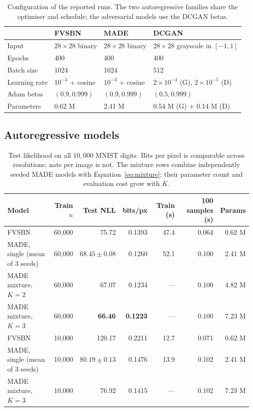 \documentclass[11pt,a4paper]{article}
\begin{document}
\begin{table}[H]
\centering
\caption{Configuration of the reported runs. The two autoregressive families share the
optimiser and schedule; the adversarial models use the DCGAN betas.}
\label{tab:setup}
\small
\begin{tabular}{llll}
\toprule
 & FVSBN & MADE & DCGAN \\
\midrule
Input & $28\times28$ binary & $28\times28$ binary & $28\times28$ grayscale in $[-1,1]$ \\
Epochs & 400 & 400 & 400 \\
Batch size & 1024 & 1024 & 512 \\
Learning rate & $10^{-3}$ + cosine & $10^{-3}$ + cosine & $2\times10^{-4}$ (G), $2\times10^{-5}$ (D) \\
Adam betas & $(0.9,0.999)$ & $(0.9,0.999)$ & $(0.5,0.999)$ \\
Parameters & 0.62 M & 2.41 M & 0.54 M (G) + 0.14 M (D) \\
\bottomrule
\end{tabular}
\end{table}

\subsection{Autoregressive models}
\label{sec:ar-results}

\begin{table}[H]
\centering
\caption{Test likelihood on all $10{,}000$ MNIST digits. Bits per pixel is comparable across
resolutions; nats per image is not. The mixture rows combine independently seeded MADE
models with Equation~\ref{eq:mixture}; their parameter count and evaluation cost grow with $K$.}
\label{tab:ar}
\small
\begin{tabular}{lrrrrrr}
\toprule
Model & Train $n$ & Test NLL & bits/px & Train (s) & 100 samples (s) & Params \\
\midrule
FVSBN & 60{,}000 & 75.72 & 0.1393 & 47.4 & 0.064 & 0.62 M \\
MADE, single (mean of 3 seeds) & 60{,}000 & $68.45 \pm 0.08$ & 0.1260 & 52.1 & 0.100 & 2.41 M \\
MADE mixture, $K=2$ & 60{,}000 & 67.07 & 0.1234 & --- & 0.100 & 4.82 M \\
MADE mixture, $K=3$ & 60{,}000 & \textbf{66.46} & \textbf{0.1223} & --- & 0.100 & 7.23 M \\
\midrule
FVSBN & 10{,}000 & 120.17 & 0.2211 & 12.7 & 0.071 & 0.62 M \\
MADE, single (mean of 3 seeds) & 10{,}000 & $80.19 \pm 0.13$ & 0.1476 & 13.9 & 0.102 & 2.41 M \\
MADE mixture, $K=3$ & 10{,}000 & 76.92 & 0.1415 & --- & 0.102 & 7.23 M \\
\bottomrule
\end{tabular}
\end{table}
\end{document}
